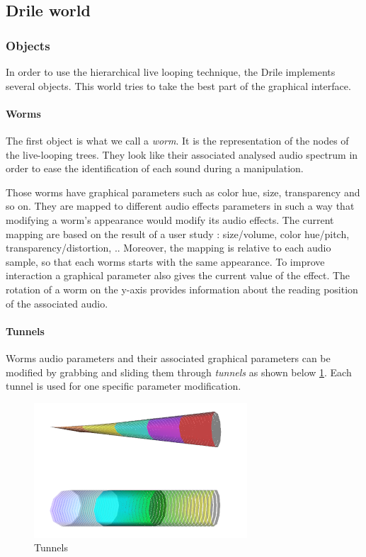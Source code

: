 \subsection{Drile world} 
 \subsubsection{Objects}
 In order to use the hierarchical live looping technique, the Drile implements several objects. This world tries to take the best part of the graphical interface.
\paragraph{Worms}    
 The first object is what we call a \textit{worm}. It is the representation of the nodes of the live-looping trees. They look like their associated analysed audio spectrum in order to ease the identification of each sound during a manipulation.
  
Those worms have graphical parameters such as color hue, size, transparency and so on. They are mapped to different audio effects parameters in such a way that modifying a worm's appearance would modify its audio effects. The current mapping are based on the result of a user study : size/volume, color hue/pitch, transparency/distortion, .. Moreover, the mapping is relative to each audio sample, so that each worms starts with the same appearance. To improve interaction a graphical parameter also gives the current value of the effect. The rotation of a worm on the y-axis provides information about the reading position of the associated audio.

\paragraph{Tunnels}    
Worms audio parameters and their associated graphical parameters can be modified by grabbing and sliding them through \textit{tunnels} as shown below \ref{fig:tunnel}. Each tunnel is used for one specific parameter modification.

\begin{figure}[h!]
\centering\includegraphics[scale=0.55]{image/tunnels.png}
\caption{Tunnels}
\label{fig:tunnel}
\end{figure} 

